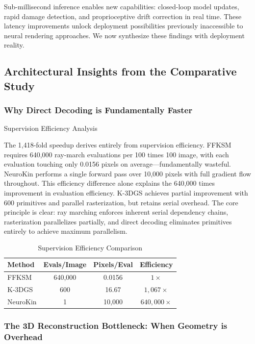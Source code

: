﻿\documentclass[11pt,a4paper]{article}
\begin{document}
Sub-millisecond inference enables new capabilities: closed-loop model updates, rapid damage detection, and proprioceptive drift correction in real time. These latency improvements unlock deployment possibilities previously inaccessible to neural rendering approaches. We now synthesize these findings with deployment reality.

\subsection{Architectural Insights from the Comparative Study}

\subsubsection{Why Direct Decoding is Fundamentally Faster} Supervision Efficiency Analysis

The 1,418-fold speedup derives entirely from supervision efficiency. FFKSM requires 640,000 ray-march evaluations per 100 times 100 image, with each evaluation touching only 0.0156 pixels on average—fundamentally wasteful. NeuroKin performs a single forward pass over 10,000 pixels with full gradient flow throughout. This efficiency difference alone explains the 640,000 times improvement in evaluation efficiency. K-3DGS achieves partial improvement with 600 primitives and parallel rasterization, but retains serial overhead. The core principle is clear: ray marching enforces inherent serial dependency chains, rasterization parallelizes partially, and direct decoding eliminates primitives entirely to achieve maximum parallelism.

\begin{table}[htbp]
\centering
\caption{Supervision Efficiency Comparison}
\label{tab:supervision-efficiency}
\begin{tabular}{l|c|c|c}
Method & Evals/Image & Pixels/Eval & Efficiency \\
\hline
FFKSM & 640,000 & 0.0156 & $1\times$ \\
K-3DGS & 600 & 16.67 & $1,067\times$ \\
NeuroKin & 1 & 10,000 & $640,000\times$ \\
\end{tabular}
\end{table}

\subsubsection{The 3D Reconstruction Bottleneck: When Geometry is Overhead}
\end{document}

